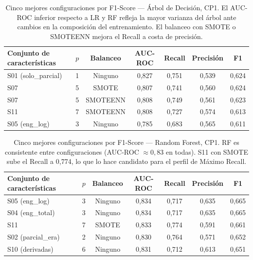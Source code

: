 \documentclass[12pt, letterpaper, openany]{report}
\begin{document}
\begin{table}[!htbp]
  \centering
  \caption{Cinco mejores configuraciones por F1-Score --- Árbol de Decisión, CP1. El AUC-ROC inferior respecto a LR y RF refleja la mayor varianza del árbol ante cambios en la composición del entrenamiento. El balanceo con SMOTE o SMOTEENN mejora el Recall a costa de precisión.}
  \label{tab:cp1_dt}
  \small
  \begin{tabular}{lcccccc}
    \toprule
    Conjunto de características & $p$ & Balanceo & AUC-ROC & Recall & Precisión & F1 \\
    \midrule
    S01 (solo\_parcial) & 1 & Ninguno  & 0,827 & 0,751 & 0,539 & 0,624 \\
    S07                 & 5 & SMOTE    & 0,807 & 0,741 & 0,560 & 0,624 \\
    S07                 & 5 & SMOTEENN & 0,808 & 0,749 & 0,561 & 0,623 \\
    S11                 & 7 & SMOTEENN & 0,808 & 0,727 & 0,574 & 0,613 \\
    S05 (eng\_log)      & 3 & Ninguno  & 0,785 & 0,683 & 0,565 & 0,611 \\
    \bottomrule
  \end{tabular}
\end{table}

\begin{table}[!htbp]
  \centering
  \caption{Cinco mejores configuraciones por F1-Score --- Random Forest, CP1. RF es consistente entre configuraciones (AUC-ROC $\approx 0{,}83$ en todas). S11 con SMOTE sube el Recall a 0,774, lo que lo hace candidato para el perfil de Máximo Recall.}
  \label{tab:cp1_rf}
  \small
  \begin{tabular}{lcccccc}
    \toprule
    Conjunto de características & $p$ & Balanceo & AUC-ROC & Recall & Precisión & F1 \\
    \midrule
    S05 (eng\_log)     & 3 & Ninguno & 0,834 & 0,717 & 0,635 & 0,665 \\
    S04 (eng\_total)   & 3 & Ninguno & 0,834 & 0,717 & 0,635 & 0,665 \\
    S11                & 7 & SMOTE   & 0,833 & 0,774 & 0,591 & 0,661 \\
    S02 (parcial\_era) & 2 & Ninguno & 0,830 & 0,764 & 0,571 & 0,652 \\
    S10 (derivadas)    & 6 & Ninguno & 0,831 & 0,712 & 0,613 & 0,651 \\
    \bottomrule
  \end{tabular}
\end{table}
\end{document}

